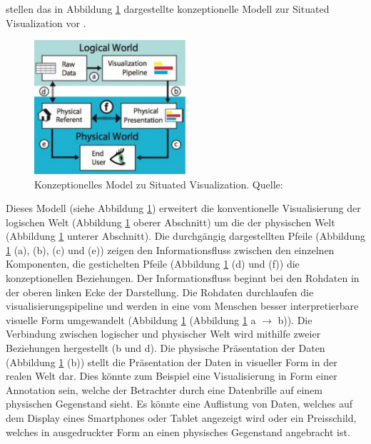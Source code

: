 \citeauthor{Willett2017} stellen das in Abbildung \ref{img:situated_visualization_concept} dargestellte konzeptionelle Modell 
zur Situated Visualization vor\cite[S.~2]{Willett2017} \cite[S.~192]{Marriott2018}.

\begin{figure}[H]
	\centering
	\includegraphics[width=0.5\textwidth]{resources/fundamentals/situated_visualization/spacially_situated_visualization_model.png}
	\caption{Konzeptionelles Model zu Situated Visualization. Quelle: \cite[S.~192]{Marriott2018}}
	\label{img:situated_visualization_concept}
\end{figure}

Dieses Modell (siehe Abbildung \ref{img:situated_visualization_concept}) erweitert die konventionelle Visualisierung der logischen Welt (Abbildung \ref{img:situated_visualization_concept} oberer Abschnitt) um die der physischen Welt (Abbildung \ref{img:situated_visualization_concept} unterer Abschnitt). 
Die durchgängig dargestellten Pfeile (Abbildung \ref{img:situated_visualization_concept} (a), (b), (c) und (e)) zeigen den Informationsfluss zwischen den einzelnen Komponenten, die gestichelten Pfeile (Abbildung \ref{img:situated_visualization_concept} (d) und (f)) die konzeptionellen Beziehungen. Der Informationsfluss beginnt bei den Rohdaten in der oberen linken Ecke der Darstellung. Die Rohdaten durchlaufen die \gls{visualisierungspipeline} und werden in eine vom Menschen besser interpretierbare visuelle Form umgewandelt (Abbildung \ref{img:situated_visualization_concept} (Abbildung \ref{img:situated_visualization_concept} a $\rightarrow$ b)). Die Verbindung zwischen logischer und physischer Welt wird mithilfe zweier Beziehungen hergestellt (b und d). 
Die physische Präsentation der Daten (Abbildung \ref{img:situated_visualization_concept} (b)) stellt die Präsentation der Daten in visueller Form in der realen Welt dar. 
Dies könnte zum Beispiel eine Visualisierung in Form einer Annotation sein, welche der Betrachter durch eine Datenbrille auf einem physischen Gegenstand sieht. Es könnte eine Auflistung von Daten, welches 
auf dem  Display eines Smartphones oder Tablet angezeigt wird oder ein Preisschild, welches in ausgedruckter Form an einen physisches Gegenstand angebracht ist.

